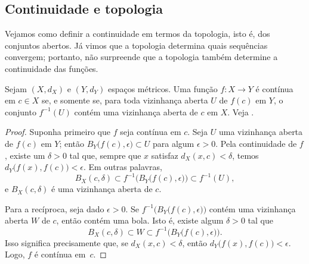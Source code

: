 \subsection{Continuidade e topologia}

Vejamos como definir a continuidade em termos da topologia, isto é,
dos conjuntos abertos. Já vimos que a topologia determina quais
sequências convergem; portanto, não surpreende que a topologia também
determine a continuidade das funções.

\begin{lemma} \label{lemma:mstopocontloc}
Sejam $(X,d_X)$ e $(Y,d_Y)$ espaços métricos.
Uma função $f \colon X \to Y$ é contínua em $c \in X$
se, e somente se, para toda vizinhança aberta $U$ de $f(c)$ em $Y$, o conjunto
$f^{-1}(U)$ contém uma vizinhança aberta de $c$ em $X$.
Veja .
\end{lemma}

\begin{myfigureht}
\caption{Para toda vizinhança $U$ de $f(c)$, o conjunto $f^{-1}(U)$ contém uma vizinhança aberta
$W$ de $c$.\label{fig:mscontfuncpt}}
\end{myfigureht}

\begin{proof}
Suponha primeiro que $f$ seja contínua em $c$.
Seja $U$ uma vizinhança aberta de $f(c)$
em $Y$; então $B_Y\bigl(f(c),\epsilon\bigr) \subset U$ para algum $\epsilon >
0$. Pela continuidade de $f$, existe um $\delta > 0$
tal que, sempre que $x$ satisfaz $d_X(x,c) < \delta$, temos
$d_Y\bigl(f(x),f(c)\bigr) < \epsilon$. Em outras palavras,
\begin{equation*}
B_X(c,\delta) \subset f^{-1}\bigl(B_Y\bigl(f(c),\epsilon\bigr)\bigr) \subset
f^{-1}(U) ,
\end{equation*}
e $B_X(c,\delta)$ é uma vizinhança aberta de $c$.

Para a recíproca,
seja dado $\epsilon > 0$. Se
$f^{-1}\bigl(B_Y\bigl(f(c),\epsilon\bigr)\bigr)$ contém uma vizinhança aberta
$W$ de $c$, então contém uma bola. Isto é, existe algum $\delta > 0$
tal que
\begin{equation*}
B_X(c,\delta) \subset W \subset f^{-1}\bigl(B_Y\bigl(f(c),\epsilon\bigr)\bigr) .
\end{equation*}
Isso significa precisamente que, se $d_X(x,c) < \delta$,
então $d_Y\bigl(f(x),f(c)\bigr) < \epsilon$.
Logo, $f$ é contínua em~$c$.
\end{proof}

